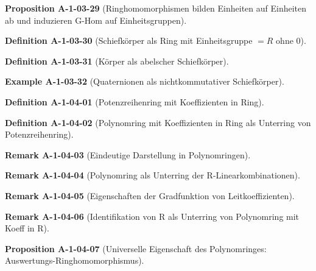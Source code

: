\documentclass[10pt, letterpaper]{article}
\newcommand{\CustomHeading}[3]{%
  \par\medskip\noindent%
  \textbf{#1 #2} \textnormal{(#3)}.\enskip%
}
\newenvironment{DEF}[2]{\CustomHeading{Definition}{#1}{#2}}{}
\newenvironment{PROP}[2]{\CustomHeading{Proposition}{#1}{#2}}{}
\newenvironment{REM}[2]{\CustomHeading{Remark}{#1}{#2}}{}
\newenvironment{EXA}[2]{\CustomHeading{Example}{#1}{#2}}{}
\begin{document}
\begin{PROP}{A-1-03-29}{Ringhomomorphismen bilden Einheiten auf Einheiten ab und induzieren G-Hom auf Einheitsgruppen}
\end{PROP}

\begin{DEF}{A-1-03-30}{Schiefkörper als Ring mit Einheitsgruppe $= R$ ohne $0$}
\end{DEF}

\begin{DEF}{A-1-03-31}{Körper als abelscher Schiefkörper}
\end{DEF}

\begin{EXA}{A-1-03-32}{Quaternionen als nichtkommutativer Schiefkörper}
\end{EXA}

\begin{DEF}{A-1-04-01}{Potenzreihenring mit Koeffizienten in Ring}
\end{DEF}

\begin{DEF}{A-1-04-02}{Polynomring mit Koeffizienten in Ring als Unterring von Potenzreihenring}
\end{DEF}

\begin{REM}{A-1-04-03}{Eindeutige Darstellung in Polynomringen}
\end{REM}

\begin{REM}{A-1-04-04}{Polynomring als Unterring der R-Linearkombinationen}
\end{REM}

\begin{REM}{A-1-04-05}{Eigenschaften der Gradfunktion von Leitkoeffizienten}
\end{REM}

\begin{REM}{A-1-04-06}{Identifikation von R als Unterring von Polynomring mit Koeff in R}
\end{REM}

\begin{PROP}{A-1-04-07}{Universelle Eigenschaft des Polynomringes: Auswertungs-Ringhomomorphismus}
\end{PROP}
\end{document}
